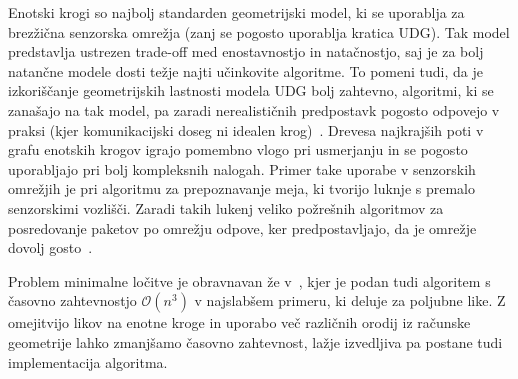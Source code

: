 \documentclass[a4paper, 12pt]{book}
\newcommand{\OO}{\ensuremath{\mathcal{O}}} %
\begin{document}
Enotski krogi so najbolj standarden geometrijski model, ki se uporablja za brezžična senzorska omrežja (zanj se pogosto uporablja kratica UDG). Tak model predstavlja ustrezen trade-off med enostavnostjo in natačnostjo, saj je za bolj natančne modele dosti težje najti učinkovite algoritme. To pomeni tudi, da je izkoriščanje geometrijskih lastnosti modela UDG bolj zahtevno, algoritmi, ki se zanašajo na tak model, pa zaradi nerealističnih predpostavk pogosto odpovejo v praksi (kjer komunikacijski doseg ni idealen krog)~\cite{WGM06}. Drevesa najkrajših poti v grafu enotskih krogov igrajo pomembno vlogo pri usmerjanju in se pogosto uporabljajo pri bolj kompleksnih nalogah. Primer take uporabe v senzorskih omrežjih je pri algoritmu za prepoznavanje meja, ki tvorijo luknje s premalo senzorskimi vozlišči. Zaradi takih lukenj veliko požrešnih algoritmov za posredovanje paketov po omrežju odpove, ker predpostavljajo, da je omrežje dovolj gosto~\cite{FGG06}.

Problem minimalne ločitve je obravnavan že v~\cite{CG16}, kjer je podan tudi algoritem s časovno zahtevnostjo $\OO(n^3)$ v najslabšem primeru, ki deluje za poljubne like. Z omejitvijo likov na enotne kroge in uporabo več različnih orodij iz računske geometrije lahko zmanjšamo časovno zahtevnost, lažje izvedljiva pa postane tudi implementacija algoritma.
\end{document}
